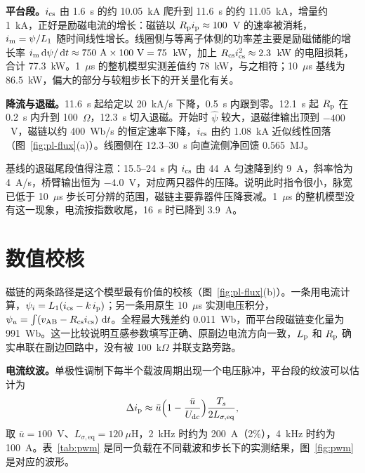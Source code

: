 \textbf{平台段。}$i_{\mathrm{cs}}$ 由 1.6~s 的约 10.05~kA 爬升到 11.6~s 的约 11.05~kA，增量约 1~kA，正好是励磁电流的增长：磁链以 $R_{\mathrm{p}}i_{\mathrm{p}}\approx100$~V 的速率被消耗，$i_{\mathrm{m}}=\psi/L_1$ 随时间线性增长。线圈侧与等离子体侧的功率差主要是励磁储能的增长率 $i\sub{m}\dd\psi/\dd t\approx750\ \mathrm{A}\times100\ \mathrm{V}=75$~kW，加上 $R_{\mathrm{cs}}i_{\mathrm{cs}}^2\approx2.3$~kW 的电阻损耗，合计 77.3~kW。1~$\mu$s 的整机模型实测差值约 78~kW，与之相符；10~$\mu$s 基线为 86.5~kW，偏大的部分与较粗步长下的开关量化有关。

\textbf{降流与退磁。}11.6~s 起给定以 20~kA/s 下降，0.5~s 内跟到零。12.1~s 起 $R_{\mathrm{p}}$ 在 0.2~s 内升到 100~$\Omega$，12.3~s 切入退磁。开始时 $\hat\psi$ 较大，退磁律输出顶到 $-400$~V，磁链以约 400~Wb/s 的恒定速率下降，$i_{\mathrm{cs}}$ 由约 1.08~kA 近似线性回落（图~\ref{fig:pl-flux}(a)）。线圈侧在 12.3--30~s 向直流侧净回馈 0.565~MJ。

基线的退磁尾段值得注意：15.5--24~s 内 $i_{\mathrm{cs}}$ 由 44~A 匀速降到约 9~A，斜率恰为 4~A/s，桥臂输出恒为 $-4.0$~V，对应两只器件的压降。说明此时指令很小，脉宽已低于 10~$\mu$s 步长可分辨的范围，磁链主要靠器件压降衰减。1~$\mu$s 的整机模型没有这一现象，电流按指数收尾，16~s 时已降到 3.9~A。


\section{数值校核}

磁链的两条路径是这个模型最有价值的校核（图~\ref{fig:pl-flux}(b)）。一条用电流计算，$\psi_i=L_1(i_{\mathrm{cs}}-k\,i_{\mathrm{p}})$；另一条用原生 10~$\mu$s 实测电压积分，$\psi_u=\int(v_{\mathrm{AB}}-R_{\mathrm{cs}}i_{\mathrm{cs}})\,\mathop{}\!\mathrm{d} t$。全程最大残差约 0.011~Wb，而平台段磁链变化量为 991~Wb。这一比较说明互感参数填写正确、原副边电流方向一致，$L_{\mathrm{p}}$ 和 $R_{\mathrm{p}}$ 确实串联在副边回路中，没有被 100~k$\Omega$ 并联支路旁路。

\textbf{电流纹波。}单极性调制下每半个载波周期出现一个电压脉冲，平台段的纹波可以估计为
\begin{equation}
\Delta i_{\mathrm{p}}\approx\bar u\Bigl(1-\frac{\bar u}{U_{\mathrm{dc}}}\Bigr)\frac{T_s}{2L_{\sigma,\mathrm{eq}}},
\label{eq:pl-ripple}
\end{equation}
取 $\bar u=100$~V、$L_{\sigma,\mathrm{eq}}=120\ \mu$H，2~kHz 时约为 200~A（2\%），4~kHz 时约为 100~A。表~\ref{tab:pwm} 是同一负载在不同载波和步长下的实测结果，图~\ref{fig:pwm} 是对应的波形。

